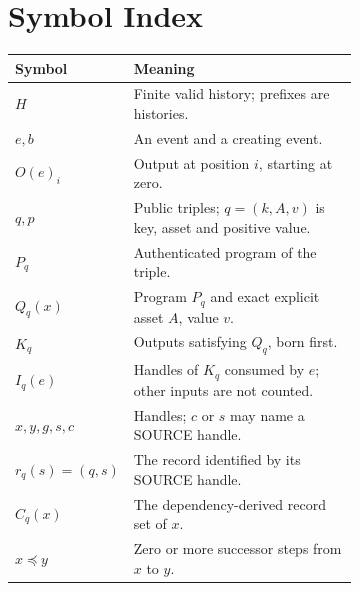 \documentclass[../main.tex]{subfiles}
\begin{document}
\section{Symbol Index}
\label{app:kpcfixed-symbols:index}
\begin{longtable}{@{}l p{0.68\linewidth}@{}}
\toprule
Symbol & Meaning \\
\midrule
$H$ & Finite valid history; prefixes are histories. \\
$e,b$ & An event and a creating event. \\
$O(e)_i$ & Output at position $i$, starting at zero. \\
$q,p$ & Public triples; $q=(k,A,v)$ is key, asset and positive value. \\
$P_q$ & Authenticated program of the triple. \\
$Q_q(x)$ & Program $P_q$ and exact explicit asset $A$, value $v$. \\
$K_q$ & Outputs satisfying $Q_q$, born first. \\
$I_q(e)$ & Handles of $K_q$ consumed by $e$; other inputs are not counted. \\
$x,y,g,s,c$ & Handles; $c$ or $s$ may name a SOURCE handle. \\
$r_q(s)=(q,s)$ & The record identified by its SOURCE handle. \\
$C_q(x)$ & The dependency-derived record set of $x$. \\
$x\preceq y$ & Zero or more successor steps from $x$ to $y$. \\
\bottomrule
\end{longtable}
\end{document}
